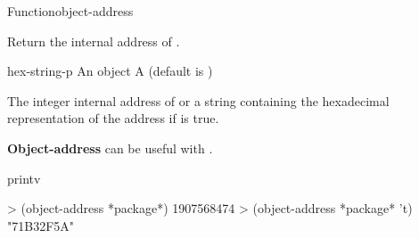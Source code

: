 \documentclass[10pt,twoside,english,pdftex]{article}
\begin{document}
\begin{functiondoc}{Function}{object-address}{
     
    \returns{} } 
%
  
\fnsyntax

\fnpurpose Return the internal address of .

\fnpackage {}

\fnmodule {}

\fnargs
\begin{args}{hex-string-p}
\arg[object] An object
 A  (default is \nil)
\end{args}

\fnreturns The integer internal address of  or a string
containing the hexadecimal representation of the address if
 is true.

\fndescription \textbf{Object-address} can be useful with \textbf{}.

\begin{alsos}{printv}
\also[printv]
\end{alsos}

\fnexamples
%
\W\supp
\begin{example}
> (object-address *package*)
1907568474
> (object-address *package* 't)
"71B32F5A"
\end{example}

\end{functiondoc}

\end{document}
